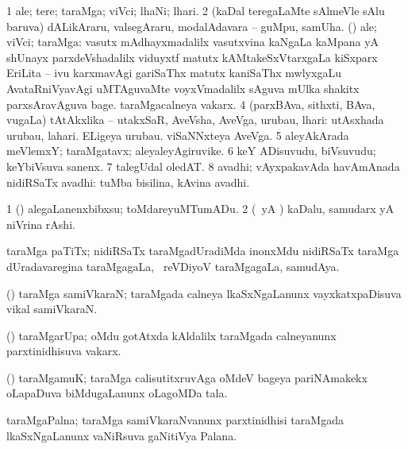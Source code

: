 {\bentry
{} 
\gl{\nA}
\expl{}
\bmng
\bnum
\num{1} ale; tere; taraMga; viVci; lhaNi; lhari. 
\num{2} (kaDal teregaLaMte sAlmeVle sAlu baruva) dALikAraru, valsegAraru, modalAdavara -- guMpu, samUha. 
 (\Bwvi) ale; viVci; taraMga: 
\banum
{} vasutx mAdhayxmadalilx vasutxvina kaNgaLa kaMpana yA shUnayx parxdeVshadalilx viduyxtf matutx kAMtakeSxVtarxgaLa kiSxparx EriLita -- ivu karxmavAgi gariSaThx matutx kaniSaThx mwlyxgaLu AvataRniVyavAgi uMTAguvaMte voyxVmadalilx sAguva mUlka shakitx parxsAravAguva bage. 
 taraMgacalneya vakarx. 
\eanum
\numie
\num{4} (parxBAva, sithxti, BAva, \mo vugaLa) tAtAkxlika -- utakxSaR, AveVsha, AveVga, urubau, lhari:  utAsxhada urubau, lahari.  ELigeya urubau.  viSaNNxteya AveVga. 
\num{5} aleyAkArada meVlemxY; taraMgatavx; aleyaleyAgiruvike. 
\num{6} keY ADisuvudu, biVsuvudu; keYbiVsuva sanenx. 
\num{7} talegUdal oledAT. 
\num{8} avadhi; vAyxpakavAda havAmAnada nidiRSaTx avadhi:  tuMba bisilina, kAvina avadhi. 
\enum
\emng

\noindent 
\gl{\pagu}
\expl{}
\bmng
\bnum
\num{1}  (\AmA) alegaLanenxbibxsu; toMdareyuMTumADu. 
\num{2}  (\kAparx\ yA \alaMshA) kaDalu, samudarx yA niVrina rAshi. 
\enum
\emng
\eentry

\bentry
{} 
\gl{\nA}
\expl{}
\bmng
taraMga paTiTx; nidiRSaTx taraMgadUradiMda inonxMdu nidiRSaTx taraMga dUradavaregina taraMgagaLa, \kanmu\ reVDiyoV taraMgagaLa, samudAya. 
\emng
\eentry

\bentry
{} 
\gl{\nA}
\expl{}
\bmng
(\Bwvi) taraMga samiVkaraN; taraMgada calneya lkaSxNgaLanunx vayxkatxpaDisuva vikal  samiVkaraN. 
\emng
\eentry

\bentry
{} 
\gl{\nA}
\expl{}
\bmng
(\Bwvi) taraMgarUpa; oMdu gotAtxda kAldalilx taraMgada calneyanunx parxtinidhisuva vakarx. 
\emng
\eentry

\bentry
{} 
\gl{\nA}
\expl{}
\bmng
(\Bwvi) taraMgamuK; taraMga calisutitxruvAga oMdeV bageya pariNAmakekx oLapaDuva biMdugaLanunx oLagoMDa tala. 
\emng
\eentry

\bentry
{} 
\gl{\nA}
\expl{}
\bmng
taraMgaPalna; taraMga samiVkaraNvanunx parxtinidhisi taraMgada lkaSxNgaLanunx vaNiRsuva gaNitiVya Palana. 
\emng
\eentry

}
